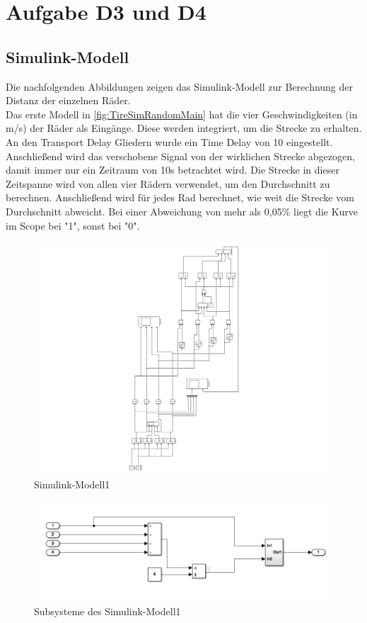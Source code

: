 \chapter{Aufgabe D3 und D4}

\section{Simulink-Modell}
Die nachfolgenden Abbildungen zeigen das Simulink-Modell zur Berechnung der Distanz der einzelnen Räder.\\
Das erste Modell in \autoref{fig:TireSimRandomMain} hat die vier Geschwindigkeiten (in m/s) der Räder als Eingänge. Diese werden integriert, um die Strecke zu erhalten. An den Transport Delay Gliedern wurde ein Time Delay von 10 eingestellt. Anschließend wird das verschobene Signal von der wirklichen Strecke abgezogen, damit immer nur ein Zeitraum von 10s betrachtet wird. Die Strecke in dieser Zeitspanne wird von allen vier Rädern verwendet, um den Durchschnitt zu berechnen. Anschließend wird für jedes Rad berechnet, wie weit die Strecke vom Durchschnitt abweicht. Bei einer Abweichung von mehr als 0,05\% liegt die Kurve im Scope bei "1", sonst bei "0".

\begin{figure}[h!]
	\centering
	\includegraphics[height=0.95\textheight]{../Graphiken/TireSimRandomMain.pdf}
	\caption{Simulink-Modell1}
	\label{fig:TireSimRandomMain}
\end{figure}

\begin{figure}
	\centering
	\includegraphics[width=1\linewidth]{../Graphiken/Simulink2}
	\caption{Subsysteme des Simulink-Modell1}
	\label{fig:Simulink2}
\end{figure}

